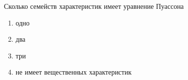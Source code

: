 Сколько семейств характеристик имеет уравнение Пуассона

\begin{enumerate}[label=\arabic*)]
    \item одно
    \item два
    \item три
    \item не имеет вещественных характеристик
\end{enumerate}

